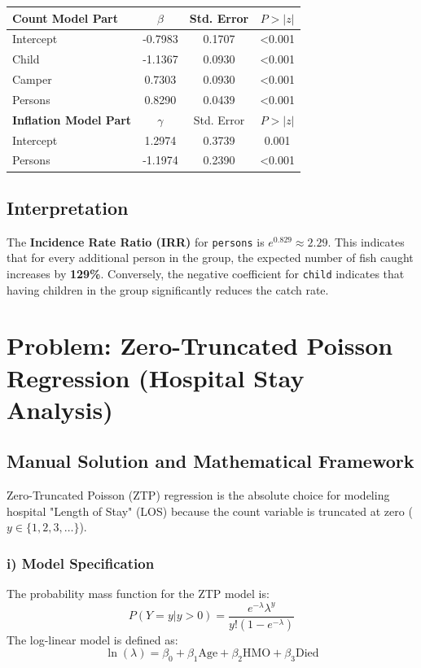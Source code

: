 \documentclass[12pt]{article}
\begin{document}
\begin{table}[h!]
\centering
\begin{tabular}{lccc}
\toprule
\textbf{Count Model Part} & $\beta$ & Std. Error & $P > |z|$ \\ \midrule
Intercept & -0.7983 & 0.1707 & <0.001 \\
Child & -1.1367 & 0.0930 & <0.001 \\
Camper & 0.7303 & 0.0930 & <0.001 \\
Persons & 0.8290 & 0.0439 & <0.001 \\ \midrule
\textbf{Inflation Model Part} & $\gamma$ & Std. Error & $P > |z|$ \\ \midrule
Intercept & 1.2974 & 0.3739 & 0.001 \\
Persons & -1.1974 & 0.2390 & <0.001 \\ \bottomrule
\end{tabular}
\end{table}

\subsection{Interpretation}
The \textbf{Incidence Rate Ratio (IRR)} for \texttt{persons} is $e^{0.829} \approx 2.29$. This indicates that for every additional person in the group, the expected number of fish caught increases by \textbf{129\%}. Conversely, the negative coefficient for \texttt{child} indicates that having children in the group significantly reduces the catch rate.

\newpage
\section{Problem: Zero-Truncated Poisson Regression (Hospital Stay Analysis)}
\label{prob_ztp}

\subsection{Manual Solution and Mathematical Framework}
Zero-Truncated Poisson (ZTP) regression is the absolute choice for modeling hospital "Length of Stay" (LOS) because the count variable is truncated at zero ($y \in \{1, 2, 3, \dots\}$).

\subsubsection{i) Model Specification}
The probability mass function for the ZTP model is:
\[ P(Y=y | y > 0) = \frac{e^{-\lambda} \lambda^y}{y! (1 - e^{-\lambda})} \]
The log-linear model is defined as:
\[ \ln(\lambda) = \beta_0 + \beta_1 \text{Age} + \beta_2 \text{HMO} + \beta_3 \text{Died} \]
\end{document}
